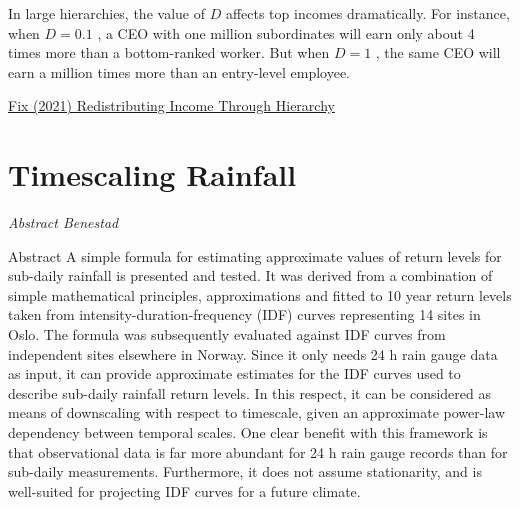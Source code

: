 \documentclass[
]{book}
\begin{document}
In large hierarchies, the value of \(D\) affects top incomes dramatically. For instance, when \(D=0.1\) , a CEO with one million subordinates will earn only about 4 times more than a bottom-ranked worker. But when \(D=1\) , the same CEO will earn a million times more than an entry-level employee.

\href{https://economicsfromthetopdown.com/2021/10/24/redistributing-income-through-hierarchy/}{Fix (2021) Redistributing Income Through Hierarchy}

\hypertarget{timescaling-rainfall}{%
\section{Timescaling Rainfall}\label{timescaling-rainfall}}

\emph{Abstract Benestad}

Abstract
A simple formula for estimating approximate values of return levels for sub-daily rainfall is
presented and tested. It was derived from a combination of simple mathematical principles,
approximations and fitted to 10 year return levels taken from intensity-duration-frequency (IDF)
curves representing 14 sites in Oslo. The formula was subsequently evaluated against IDF curves
from independent sites elsewhere in Norway. Since it only needs 24 h rain gauge data as input, it
can provide approximate estimates for the IDF curves used to describe sub-daily rainfall return
levels. In this respect, it can be considered as means of downscaling with respect to timescale, given
an approximate power-law dependency between temporal scales. One clear benefit with this
framework is that observational data is far more abundant for 24 h rain gauge records than for
sub-daily measurements. Furthermore, it does not assume stationarity, and is well-suited for
projecting IDF curves for a future climate.
\end{document}
